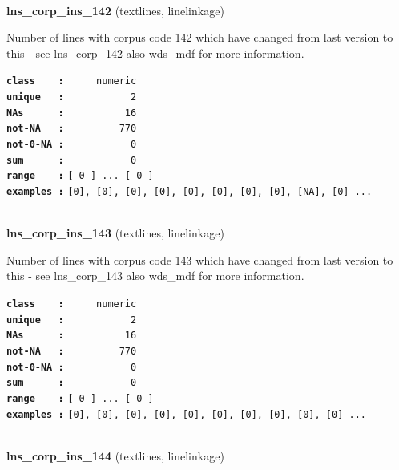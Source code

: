 \documentclass[]{article}
\begin{document}
~

\textbf{lns\_corp\_ins\_142} (textlines, linelinkage)

Number of lines with corpus code 142 which have changed from last
version to this - see lns\_corp\_142 also wds\_mdf for more information.

\textbf{\texttt{class\ \ \ \ :}} \texttt{~~~~~numeric}\\
\textbf{\texttt{unique\ \ \ :}} \texttt{~~~~~~~~~~~2}\\
\textbf{\texttt{NAs\ \ \ \ \ \ :}} \texttt{~~~~~~~~~~16}\\
\textbf{\texttt{not-NA\ \ \ :}} \texttt{~~~~~~~~~770}\\
\textbf{\texttt{not-0-NA\ :}} \texttt{~~~~~~~~~~~0}\\
\textbf{\texttt{sum\ \ \ \ \ \ :}} \texttt{~~~~~~~~~~~0}\\
\textbf{\texttt{range\ \ \ \ :}}
\texttt{{[}\ 0\ {]}\ ...\ {[}\ 0\ {]}}\\
\textbf{\texttt{examples\ :}}
\texttt{{[}0{]},\ {[}0{]},\ {[}0{]},\ {[}0{]},\ {[}0{]},\ {[}0{]},\ {[}0{]},\ {[}0{]},\ {[}NA{]},\ {[}0{]}\ ...}\\

~

\textbf{lns\_corp\_ins\_143} (textlines, linelinkage)

Number of lines with corpus code 143 which have changed from last
version to this - see lns\_corp\_143 also wds\_mdf for more information.

\textbf{\texttt{class\ \ \ \ :}} \texttt{~~~~~numeric}\\
\textbf{\texttt{unique\ \ \ :}} \texttt{~~~~~~~~~~~2}\\
\textbf{\texttt{NAs\ \ \ \ \ \ :}} \texttt{~~~~~~~~~~16}\\
\textbf{\texttt{not-NA\ \ \ :}} \texttt{~~~~~~~~~770}\\
\textbf{\texttt{not-0-NA\ :}} \texttt{~~~~~~~~~~~0}\\
\textbf{\texttt{sum\ \ \ \ \ \ :}} \texttt{~~~~~~~~~~~0}\\
\textbf{\texttt{range\ \ \ \ :}}
\texttt{{[}\ 0\ {]}\ ...\ {[}\ 0\ {]}}\\
\textbf{\texttt{examples\ :}}
\texttt{{[}0{]},\ {[}0{]},\ {[}0{]},\ {[}0{]},\ {[}0{]},\ {[}0{]},\ {[}0{]},\ {[}0{]},\ {[}0{]},\ {[}0{]}\ ...}\\

~

\textbf{lns\_corp\_ins\_144} (textlines, linelinkage)
\end{document}
